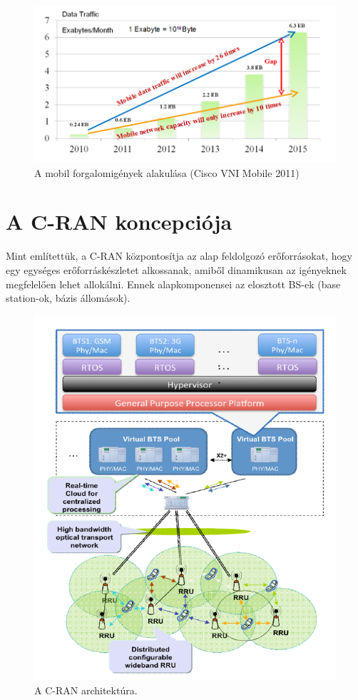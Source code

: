 \begin{figure}[!ht]
\centering
\includegraphics[width=\textwidth, keepaspectratio]{figures/traffic.png}
\caption{A mobil forgalomigények alakulása (Cisco VNI Mobile 2011)} 
\label{fig:traffic}
\end{figure} 

\section{A C-RAN koncepciója}
\hspace{2mm} \indent Mint említettük, a C-RAN központosítja az alap feldolgozó erőforrásokat, hogy egy egységes erőforráskészletet alkossanak, amiből dinamikusan az igényeknek megfelelően lehet allokálni. Ennek alapkomponensei az elosztott BS-ek (base station-ok, bázis állomások). \cite{RecentCRANProg}
\begin{figure}[!ht]
\centering
\includegraphics[width=\textwidth, keepaspectratio]{figures/cran_arch.png}
\caption{A C-RAN architektúra.\cite{RecentCRANProg}} 
\label{fig:cran_arch}
\end{figure} 

